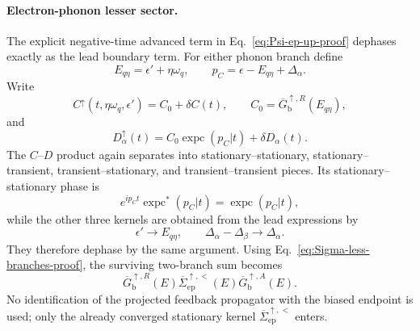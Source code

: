 \documentclass[
 reprint,
 superscriptaddress,
 amsmath,amssymb,
 aps,prb,
 longbibliography,
 floatfix
]{revtex4-2}
\newcommand{\ep}{\mathrm{ep}}
\newcommand{\expc}{\operatorname{expc}}
\newcommand{\barSigma}{\overline{\Sigma}}
\begin{document}
\paragraph{Electron-phonon lesser sector.}
The explicit negative-time advanced term in Eq.~\eqref{eq:Psi-ep-up-proof} dephases exactly as the lead boundary term. For either phonon branch define
\begin{equation*}
E_{q\eta}=\epsilon'+\eta\omega_q,
\qquad
p_C=\epsilon-E_{q\eta}+\Delta_\alpha.
\end{equation*}
Write
\begin{equation*}
C^\uparrow(t,\eta\omega_q,\epsilon')
=
C_0+\delta C(t),
\qquad
C_0=
\overline G_{\mathrm b}^{\uparrow,R}(E_{q\eta}),
\end{equation*}
and
\begin{equation*}
D_\alpha^\uparrow(t)
=
C_0\expc(p_C|t)
+\delta D_\alpha(t).
\end{equation*}
The $C$--$D$ product again separates into stationary--stationary, stationary--transient, transient--stationary, and transient--transient pieces. Its stationary--stationary phase is
\begin{equation*}
e^{ip_Ct}\expc^*(p_C|t)
=
\expc(p_C|t),
\end{equation*}
while the other three kernels are obtained from the lead expressions by
\begin{equation*}
\epsilon'\rightarrow E_{q\eta},
\qquad
\Delta_\alpha-\Delta_\beta
\rightarrow\Delta_\alpha.
\end{equation*}
They therefore dephase by the same argument. Using Eq.~\eqref{eq:Sigma-less-branches-proof}, the surviving two-branch sum becomes
\begin{equation*}
\overline G_{\mathrm b}^{\uparrow,R}(E)
\barSigma_{\ep}^{\uparrow,<}(E)
\overline G_{\mathrm b}^{\uparrow,A}(E).
\end{equation*}
No identification of the projected feedback propagator with the biased endpoint is used; only the already converged stationary kernel $\barSigma_{\ep}^{\uparrow,<}$ enters.
\end{document}
